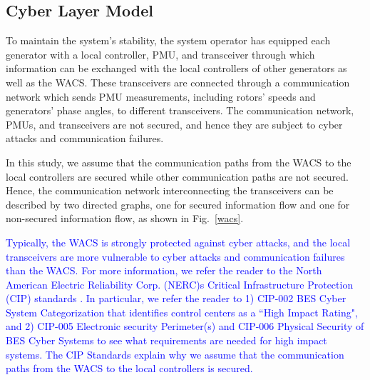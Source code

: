 \subsection{Cyber Layer Model}
To maintain the system's stability, the system operator has equipped each generator with a local controller, PMU, and transceiver through which information can be exchanged with the local controllers of other generators as well as the WACS. These transceivers are connected through a communication network which sends PMU measurements, including rotors' speeds and generators' phase angles, to different transceivers. The communication network, PMUs, and transceivers are not secured, and hence they are subject to cyber attacks and communication failures.

In this study, we assume that the communication paths from the WACS to the local controllers are secured while other communication paths are not secured. Hence, the communication network interconnecting the transceivers can be described by two directed graphs, one for secured information flow and one for non-secured information flow, as shown in Fig.~\ref{wacs}.


\textcolor{blue}{Typically, the WACS is strongly protected against cyber attacks, and the local transceivers are more vulnerable to cyber attacks and communication failures than the WACS. For more information, we refer the reader to the North American Electric Reliability Corp. (NERC)s Critical Infrastructure Protection (CIP) standards \cite{nerc}. In particular, we refer the reader to 1) CIP-002 BES Cyber System Categorization that identifies control centers as a ``High Impact Rating", and 2) CIP-005 Electronic security Perimeter(s) and CIP-006 Physical Security of BES Cyber Systems to see what requirements are needed for high impact systems. The CIP Standards explain why we assume that the communication paths from the WACS to the local controllers is secured.}

